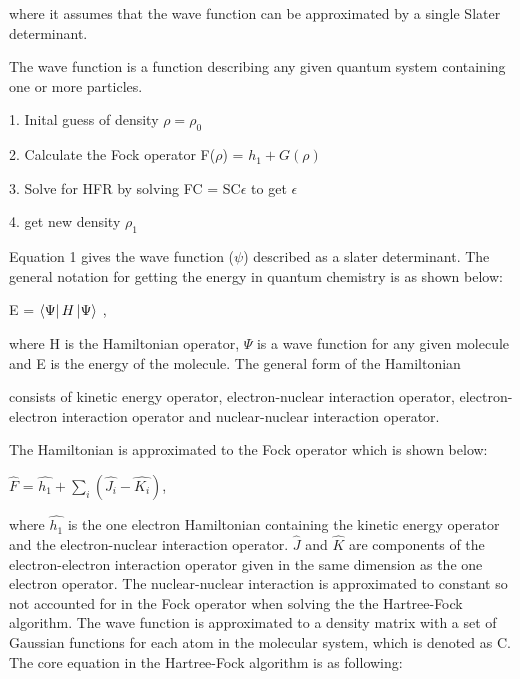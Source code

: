\documentclass[twoside]{article}
\begin{document}
where it assumes that the wave function can be approximated by a single Slater determinant.  

The wave function is a function describing any given quantum system containing one or more particles. 

1. Inital guess of density $\rho = \rho_0$

2. Calculate the Fock operator F($\rho$) = $h_1 + G(\rho)$

3. Solve for HFR by solving FC = SC$\epsilon$ to get $\epsilon$

4. get new density $\rho_1$

Equation 1 gives the wave function ($\psi$) described as a slater determinant. The general notation for getting the energy in quantum chemistry is as shown below:


E = $\Bra{\Psi}H\Ket{\Psi}$ ,

where H is the Hamiltonian operator, $\Psi$ is a wave function for any given molecule and E is the energy of the molecule. The general form of the Hamiltonian 

consists of kinetic energy operator, electron-nuclear interaction operator, electron-electron interaction operator and nuclear-nuclear interaction operator.

 The Hamiltonian is approximated to the Fock operator which is shown below:


$\hat{F}$ = $\hat{h_1} + \sum\limits_{i}(\hat{J_i} - \hat{K_i})$,

where $\hat{h_1}$ is the one electron Hamiltonian containing the kinetic energy operator and the electron-nuclear interaction operator. $\hat{J}$ and $\hat{K}$ are components of the electron-electron interaction operator given in the same dimension as the one electron operator. The nuclear-nuclear interaction is approximated to constant so not accounted for in the Fock operator when solving 
the the Hartree-Fock algorithm. The wave function is approximated to a density matrix with a set of Gaussian functions for each atom in the molecular system, which is denoted as C. The core equation in the Hartree-Fock algorithm is as following:
\end{document}
